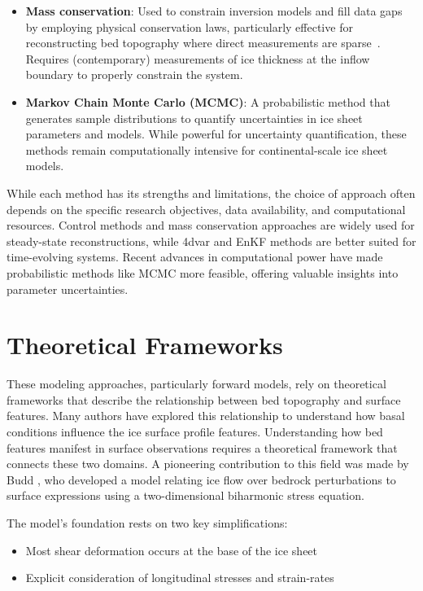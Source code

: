 \begin{itemize}
\begin{itemize}
            \item\textbf{Mass conservation}: Used to constrain inversion models and fill data gaps by employing physical conservation laws, particularly effective for reconstructing bed topography where direct measurements are sparse~\cite{Morlighem_2017, Morlighem_2020}. Requires (contemporary) measurements of ice thickness at the inflow boundary to properly constrain the system\cite{Morlighem_Goldberg_2024}.

            \item\textbf{Markov Chain Monte Carlo (MCMC)}: A probabilistic method that generates sample distributions to quantify uncertainties in ice sheet parameters and models\cite{Morlighem_Goldberg_2024}. While powerful for uncertainty quantification, these methods remain computationally intensive for continental-scale ice sheet models\cite{Morlighem_Goldberg_2024}.
        \end{itemize}
    
\end{itemize} 
While each method has its strengths and limitations, the choice of approach often depends on the specific research objectives, data availability, and computational resources. Control methods and mass conservation approaches are widely used for steady-state reconstructions, while 4dvar and EnKF methods are better suited for time-evolving systems. Recent advances in computational power have made probabilistic methods like MCMC more feasible, offering valuable insights into parameter uncertainties.

\newpage
\section{Theoretical Frameworks}
These modeling approaches, particularly forward models, rely on theoretical frameworks that describe the relationship between bed topography and surface features. Many authors have explored this relationship to understand how basal conditions influence the ice surface profile features. Understanding how bed features manifest in surface observations requires a theoretical framework that connects these two domains. A pioneering contribution to this field was made by Budd \cite{Budd_1970}, who developed a model relating ice flow over bedrock perturbations to surface expressions using a two-dimensional biharmonic stress equation. 

The model's foundation rests on two key simplifications:
\begin{itemize}
    \item Most shear deformation occurs at the base of the ice sheet
    \item Explicit consideration of longitudinal stresses and strain-rates
\end{itemize}

